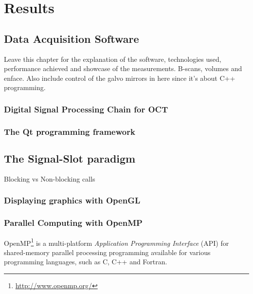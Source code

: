 
\chapter{Results} %
\label{ch:results} %


\section{Data Acquisition Software}
Leave this chapter for the explanation of the software, technologies used, performance achieved and showcase of the measurements. B-scans, volumes and enface. Also include control of the galvo mirrors in here since it's about C++ programming. 
\subsection{Digital Signal Processing Chain for OCT}

\subsection{The Qt programming framework}
	\section{The Signal-Slot paradigm}
    Blocking vs Non-blocking calls

\subsection{Displaying graphics with OpenGL}

\subsection{Parallel Computing with OpenMP}
OpenMP\footnote{\url{http://www.openmp.org/}}  is a multi-platform \emph{Application Programming Interface} (API) for shared-memory parallel processing programming available for various programming languages, such as C, C++ and Fortran. 




